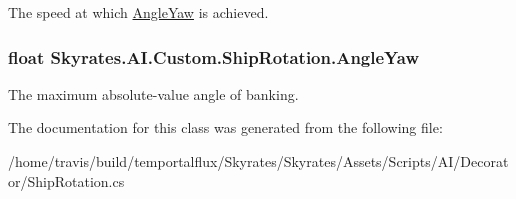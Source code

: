 The speed at which \hyperlink{class_skyrates_1_1_a_i_1_1_custom_1_1_ship_rotation_abcda42fd1d33d8189aadb283d3ba248c}{Angle\-Yaw} is achieved. 

\hypertarget{class_skyrates_1_1_a_i_1_1_custom_1_1_ship_rotation_abcda42fd1d33d8189aadb283d3ba248c}{
\subsubsection[{Angle\-Yaw}]{\setlength{\rightskip}{0pt plus 5cm}float Skyrates.\-A\-I.\-Custom.\-Ship\-Rotation.\-Angle\-Yaw}}\label{class_skyrates_1_1_a_i_1_1_custom_1_1_ship_rotation_abcda42fd1d33d8189aadb283d3ba248c}


The maximum absolute-\/value angle of banking. 



The documentation for this class was generated from the following file\-:\begin{DoxyCompactItemize}
\item 
/home/travis/build/temportalflux/\-Skyrates/\-Skyrates/\-Assets/\-Scripts/\-A\-I/\-Decorator/Ship\-Rotation.\-cs\end{DoxyCompactItemize}
